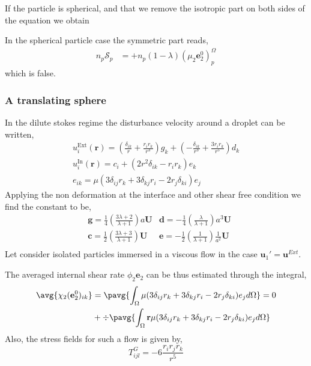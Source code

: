 If the particle is spherical, and that we remove the isotropic part on both sides of the equation we obtain 

In the spherical particle case the symmetric part reads, 
\begin{align*}
    n_p \mathscr{S}_p
    &= 
    + n_p (1 - \lambda)\left(
        \mu_2 \textbf{e}_2^0
    \right)_p^\Omega 
\end{align*}
which is false. 

\subsubsection{A translating sphere}
In the dilute stokes regime the disturbance velocity around a droplet can be written, 
\begin{align*}
    u_i^\text{Ext}(\textbf{r})
    = \left(\frac{\delta_{ik}}{r} + \frac{r_ir_k}{r^3}\right)  g_k
    + \left(-\frac{\delta_{ik}}{r^3} + \frac{3r_ir_k}{r^5}\right)  d_k\\
    u_i^\text{In}(\textbf{r})
    = c_i
    + \left(2 r^2 \delta_{ik} - r_ir_k\right) e_k\\
    e_{ik}
    = \mu(
        3 \delta_{ij} r_k 
        + 3 \delta_{kj} r_i
        -2 r_j \delta_{ki}
    )e_j 
\end{align*}
Applying the non deformation at the interface and other shear free condition we find the constant to be, 
\begin{align*}
    &\textbf{g} = \frac{1}{4}\left(\frac{3\lambda + 2}{\lambda +1}\right) a \textbf{U}
    &\textbf{d} = -\frac{1}{4}\left(\frac{\lambda}{\lambda +1}\right) a^3 \textbf{U}\\
    &\textbf{c} = \frac{1}{2}\left(\frac{3\lambda + 3}{\lambda +1}\right) \textbf{U}
    &\textbf{e} = -\frac{1}{2}\left(\frac{1}{\lambda +1}\right) \frac{1}{a^2} \textbf{U}\\
\end{align*}
Let consider isolated particles immersed in a viscous flow in the case $\textbf{u}_1' = \textbf{u}^{Ext}$.

The averaged internal shear rate $\phi_2 \textbf{e}_2$ can be thus estimated through the integral, 
\begin{align*}
    \avg{\chi_2 (\textbf{e}_2^0)_{ik}}
    &= \pavg{\int_{\Omega} \mu(
        3 \delta_{ij} r_k 
        + 3 \delta_{kj} r_i
        -2 r_j \delta_{ki}
    )e_j d\Omega}
    = 0\\
    &+ \div \pavg{\int_{\Omega} \textbf{r}\mu(
        3 \delta_{ij} r_k 
        + 3 \delta_{kj} r_i
        -2 r_j \delta_{ki}
    )e_j d\Omega}
\end{align*}
Also, the stress fields for such a flow is given by, 
\begin{equation*}
    T^G_{ijl} 
    = -6\frac{r_ir_jr_k}{r^5}
\end{equation*}

